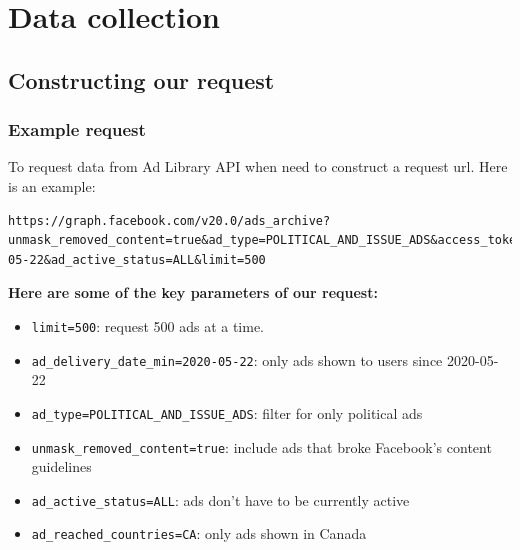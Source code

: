 \documentclass[
  letterpaper,
  DIV=11,
  numbers=noendperiod]{scrreprt}
\begin{document}

\chapter{Data collection}\label{sec-collection}

\section{Constructing our request}\label{constructing-our-request}

\subsection{Example request}\label{example-request}

To request data from Ad Library API when need to construct a request
url. Here is an example:

\begin{verbatim}
https://graph.facebook.com/v20.0/ads_archive?unmask_removed_content=true&ad_type=POLITICAL_AND_ISSUE_ADS&access_token=INSERT_YOUR_TOKEN&fields=id,ad_creation_time,ad_creative_bodies,ad_creative_link_captions,ad_creative_link_descriptions,ad_creative_link_titles,ad_delivery_start_time,ad_delivery_stop_time,ad_snapshot_url,currency,delivery_by_region,demographic_distribution,bylines,impressions,languages,page_id,page_name,publisher_platforms,spend,target_locations,target_gender,target_ages,estimated_audience_size&search_terms=.&ad_reached_countries=CA&search_page_ids=&ad_delivery_date_min=2020-05-22&ad_active_status=ALL&limit=500
\end{verbatim}

\textbf{Here are some of the key parameters of our request:}

\begin{itemize}
\item
  \texttt{limit=500}: request 500 ads at a time.
\item
  \texttt{ad\_delivery\_date\_min=2020-05-22}: only ads shown to users
  since 2020-05-22
\item
  \texttt{ad\_type=POLITICAL\_AND\_ISSUE\_ADS}: filter for only
  political ads
\item
  \texttt{unmask\_removed\_content=true}: include ads that broke
  Facebook's content guidelines
\item
  \texttt{ad\_active\_status=ALL}: ads don't have to be currently active
\item
  \texttt{ad\_reached\_countries=CA}: only ads shown in Canada
\end{itemize}
\end{document}
